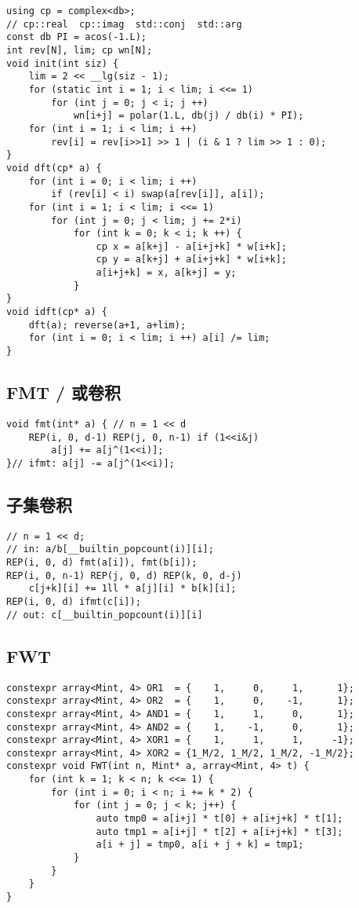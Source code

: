 \documentclass[a4paper,landscape,twocolumn]{ctexart}
\begin{document}
\begin{lstlisting}
using cp = complex<db>;
// cp::real  cp::imag  std::conj  std::arg
const db PI = acos(-1.L);
int rev[N], lim; cp wn[N];
void init(int siz) {
	lim = 2 << __lg(siz - 1);
	for (static int i = 1; i < lim; i <<= 1)
		for (int j = 0; j < i; j ++)
			wn[i+j] = polar(1.L, db(j) / db(i) * PI);
	for (int i = 1; i < lim; i ++)
		rev[i] = rev[i>>1] >> 1 | (i & 1 ? lim >> 1 : 0);
}
void dft(cp* a) {
	for (int i = 0; i < lim; i ++)
		if (rev[i] < i) swap(a[rev[i]], a[i]);
	for (int i = 1; i < lim; i <<= 1)
		for (int j = 0; j < lim; j += 2*i)
			for (int k = 0; k < i; k ++) {
				cp x = a[k+j] - a[i+j+k] * w[i+k];
				cp y = a[k+j] + a[i+j+k] * w[i+k];
				a[i+j+k] = x, a[k+j] = y;
			}
}
void idft(cp* a) {
	dft(a); reverse(a+1, a+lim);
	for (int i = 0; i < lim; i ++) a[i] /= lim;
}
\end{lstlisting}

\subsection{FMT / 或卷积}

\begin{lstlisting}
void fmt(int* a) { // n = 1 << d
	REP(i, 0, d-1) REP(j, 0, n-1) if (1<<i&j)
		a[j] += a[j^(1<<i)];
}// ifmt: a[j] -= a[j^(1<<i)];
\end{lstlisting}

\subsection{子集卷积}

\begin{lstlisting}
// n = 1 << d;
// in: a/b[__builtin_popcount(i)][i];
REP(i, 0, d) fmt(a[i]), fmt(b[i]);
REP(i, 0, n-1) REP(j, 0, d) REP(k, 0, d-j)
	c[j+k][i] += 1ll * a[j][i] * b[k][i];
REP(i, 0, d) ifmt(c[i]);
// out: c[__builtin_popcount(i)][i]
\end{lstlisting}

\subsection{FWT}

\begin{lstlisting}
constexpr array<Mint, 4> OR1  = {    1,     0,     1,      1};
constexpr array<Mint, 4> OR2  = {    1,     0,    -1,      1};
constexpr array<Mint, 4> AND1 = {    1,     1,     0,      1};
constexpr array<Mint, 4> AND2 = {    1,    -1,     0,      1};
constexpr array<Mint, 4> XOR1 = {    1,     1,     1,     -1};
constexpr array<Mint, 4> XOR2 = {1_M/2, 1_M/2, 1_M/2, -1_M/2};
constexpr void FWT(int n, Mint* a, array<Mint, 4> t) {
	for (int k = 1; k < n; k <<= 1) {
		for (int i = 0; i < n; i += k * 2) {
			for (int j = 0; j < k; j++) {
				auto tmp0 = a[i+j] * t[0] + a[i+j+k] * t[1];
				auto tmp1 = a[i+j] * t[2] + a[i+j+k] * t[3];
				a[i + j] = tmp0, a[i + j + k] = tmp1;
			}
		}
	}
}
\end{lstlisting}
\end{document}
